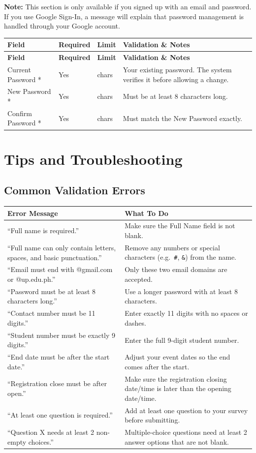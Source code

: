 \documentclass[12pt, a4paper]{article}
\newenvironment{fieldtable}{%
  \begin{longtable}{|>{\raggedright\arraybackslash}p{2.5cm}|>{\raggedright\arraybackslash}p{1.5cm}|>{\raggedright\arraybackslash}p{2.5cm}|>{\raggedright\arraybackslash}p{7.5cm}|}
  \hline
  \rowcolor{lightgray}
  \textbf{Field} & \textbf{Required} & \textbf{Limit} & \textbf{Validation \& Notes} \\
  \hline
  \endfirsthead
  \hline
  \rowcolor{lightgray}
  \textbf{Field} & \textbf{Required} & \textbf{Limit} & \textbf{Validation \& Notes} \\
  \hline
  \endhead
  \hline
  \endfoot
}{%
  \end{longtable}
}
\newcommand{\fieldrow}[4]{%
  #1 & #2 & #3 & #4 \\ \hline
}
\begin{document}
\textbf{Note:} This section is only available if you signed up with an email and password. If you use Google Sign-In, a message will explain that password management is handled through your Google account.

\begin{fieldtable}
  \fieldrow{Current Password *}{Yes}{16 chars}{Your existing password. The system verifies it before allowing a change.}
  \fieldrow{New Password *}{Yes}{16 chars}{Must be at least 8 characters long.}
  \fieldrow{Confirm Password *}{Yes}{16 chars}{Must match the New Password exactly.}
\end{fieldtable}

\newpage
\section{Tips and Troubleshooting}

\subsection{Common Validation Errors}

\begin{longtable}{|>{\raggedright\arraybackslash}p{5cm}|>{\raggedright\arraybackslash}p{8cm}|}
\hline
\rowcolor{lightgray}
\textbf{Error Message} & \textbf{What To Do} \\
\hline
``Full name is required.'' & Make sure the Full Name field is not blank. \\
\hline
``Full name can only contain letters, spaces, and basic punctuation.'' & Remove any numbers or special characters (e.g.\ \texttt{\#}, \texttt{\&}) from the name. \\
\hline
``Email must end with @gmail.com or @up.edu.ph.'' & Only these two email domains are accepted. \\
\hline
``Password must be at least 8 characters long.'' & Use a longer password with at least 8 characters. \\
\hline
``Contact number must be 11 digits.'' & Enter exactly 11 digits with no spaces or dashes. \\
\hline
``Student number must be exactly 9 digits.'' & Enter the full 9-digit student number. \\
\hline
``End date must be after the start date.'' & Adjust your event dates so the end comes after the start. \\
\hline
``Registration close must be after open.'' & Make sure the registration closing date/time is later than the opening date/time. \\
\hline
``At least one question is required.'' & Add at least one question to your survey before submitting. \\
\hline
``Question X needs at least 2 non-empty choices.'' & Multiple-choice questions need at least 2 answer options that are not blank. \\
\hline
\end{longtable}
\end{document}
